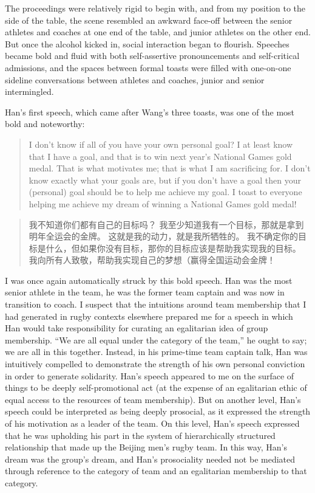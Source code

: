 \begin{CJK}{UTF8}{gbsn}
The proceedings were relatively rigid to begin with, and from my position to the side of the table, the scene resembled an awkward face-off between the senior athletes and coaches at one end of the table, and junior athletes on the other end.  But once the alcohol kicked in, social interaction began to flourish. Speeches became bold and fluid with both self-assertive pronouncements and self-critical admissions, and the spaces between formal toasts were filled with one-on-one sideline conversations between athletes and coaches, junior and senior intermingled.

Han's first speech, which came after Wang's three toasts, was one of the most bold and noteworthy:

  \begin{quotation}
    I don’t know if all of you have your own personal goal?  I at least know that I have a goal, and that is to win next year’s National Games gold medal.  That is what motivates me; that is what I am sacrificing for.  I don’t know exactly what your goals are, but if you don't have a goal then your (personal) goal should be to help me achieve my goal.  I toast to everyone helping me achieve my dream of winning a National Games gold medal!
  \end{quotation}

  \begin{quotation}
      我不知道你们都有自己的目标吗？ 我至少知道我有一个目标，那就是拿到明年全运会的金牌。 这就是我的动力，就是我所牺牲的。 我不确定你的目标是什么，但如果你没有目标，那你的目标应该是帮助我实现我的目标。 我向所有人致敬，帮助我实现自己的梦想（赢得全国运动会金牌！
  \end{quotation}

I was once again automatically struck by this bold speech.  Han was the most senior athlete in the team, he was the former team captain and was now in transition to coach.  I suspect that the intuitions around team membership that I had generated in rugby contexts elsewhere prepared me for a speech in which Han would take responsibility for curating an egalitarian idea of group membership.  ``We are all equal under the category of the team,'' he ought to say; we are all in this together.   Instead, in his prime-time team captain talk, Han was intuitively compelled to demonstrate the strength of his own personal conviction in order to generate solidarity. Han's speech appeared to me on the surface of things to be deeply self-promotional act (at the expense of an egalitarian ethic of equal access to the resources of team membership). But on another level, Han's speech could be interpreted as being deeply prosocial, as it expressed the strength of his motivation as a leader of the team. On this level, Han's speech expressed that he was upholding his part in the system of hierarchically structured relationship that made up the Beijing men's rugby team.  In this way, Han's dream was the group's dream, and Han's prosociality needed not be mediated through reference to the category of team and an egalitarian membership to that category.


\end{CJK}
